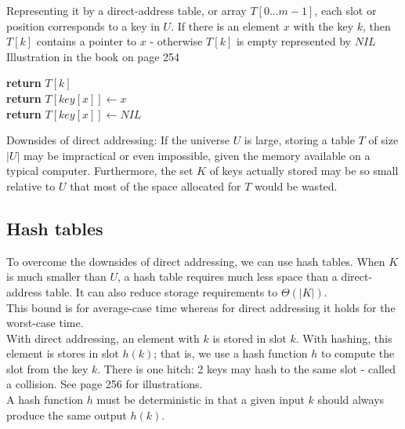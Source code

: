 \documentclass[12pt]{article}
\begin{document}
Representing it by a direct-address table, or array $T[0...m-1]$, each slot or position corresponds to a key  in $U$. If there is an element $x$ with the key $k$, then $T[k]$ contains a pointer to $x$ - otherwise $T[k]$ is empty represented by $NIL$\\

Illustration in the book on page 254
\begin{algorithm}
\begin{algorithmic}[1]
   \State \textbf{return} $T[k]$\\
   
   \State \textbf{return} $T[key[x]] \leftarrow x$\\

   \State \textbf{return} $T[key[x]] \leftarrow NIL$
\end{algorithmic}
\end{algorithm}

Downsides of direct addressing: If the universe $U$ is large, storing a table $T$ of size $|U|$ may be impractical or even impossible, given the memory available on a typical computer. Furthermore, the set $K$ of keys actually stored may be so small relative to $U$ that most of the space allocated for $T$ would be wasted. 

\subsection{Hash tables}
To overcome the downsides of direct addressing, we can use hash tables. When $K$ is much smaller than $U$, a hash table requires much less space than a direct-address table. It can also reduce storage requirements to $\Theta (|K|)$. \\

This bound is for average-case time whereas for direct addressing it holds for the worst-case time. \\

With direct addressing, an element with $k$ is stored in slot $k$. With hashing, this element is stores in slot $h(k)$; that is, we use a hash function $h$ to compute the slot from the key $k$. There is one hitch: 2 keys may hash to the same slot - called a collision. See page 256 for illustrations. \\

A hash function $h$ must be deterministic in that a given input $k$ should always produce the same output $h(k)$. \\
\end{document}

